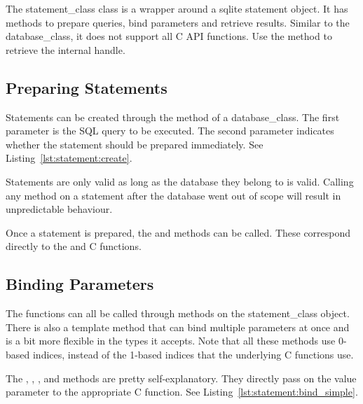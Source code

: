 The \gls{statement_class} class is a wrapper around a \gls{sqlite} statement object. It has methods to prepare queries, bind parameters and retrieve results. Similar to the \gls{database_class}, it does not support all C API functions. Use the  method to retrieve the internal handle.

\subsection{Preparing Statements}
\label{section:statement:create}

Statements can be created through the  method of a \gls{database_class}. The first parameter is the SQL query to be executed. The second parameter indicates whether the statement should be prepared immediately. See Listing~\ref{lst:statement:create}.



Statements are only valid as long as the database they belong to is valid. Calling any method on a statement after the database went out of scope will result in unpredictable behaviour.

Once a statement is prepared, the  and  methods can be called. These correspond directly to the  and  C functions.

\subsection{Binding Parameters}
\label{section:statement:bind}

The  functions can all be called through methods on the \gls{statement_class} object. There is also a template method that can bind multiple parameters at once and is a bit more flexible in the types it accepts. Note that all these methods use 0-based indices, instead of the 1-based indices that the underlying C functions use.

The , , ,  and  methods are pretty self-explanatory. They directly pass on the value parameter to the appropriate C function. See Listing~\ref{lst:statement:bind_simple}.



